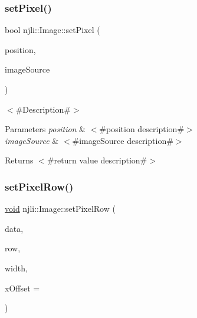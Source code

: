 \subsubsection{\texorpdfstring{set\+Pixel()}{setPixel()}\hspace{0.1cm}{\footnotesize\ttfamily [2/2]}}
{\footnotesize\ttfamily bool njli\+::\+Image\+::set\+Pixel (\begin{DoxyParamCaption}\item[{const bt\+Vector2 \&}]{position,  }\item[{const \mbox{\hyperlink{classnjli_1_1_image}{Image}} \&}]{image\+Source }\end{DoxyParamCaption})}

$<$\#\+Description\#$>$


\begin{DoxyParams}{Parameters}
{\em position} & $<$\#position description\#$>$ \\
\hline
{\em image\+Source} & $<$\#image\+Source description\#$>$\\
\hline
\end{DoxyParams}
\begin{DoxyReturn}{Returns}
$<$\#return value description\#$>$ 
\end{DoxyReturn}
\mbox{\label{classnjli_1_1_image_a795757e6b8ced8be19cfb1cab560ffd4}} 
\subsubsection{\texorpdfstring{set\+Pixel\+Row()}{setPixelRow()}}
{\footnotesize\ttfamily \mbox{\hyperlink{_thread_8h_af1e856da2e658414cb2456cb6f7ebc66}{void}} njli\+::\+Image\+::set\+Pixel\+Row (\begin{DoxyParamCaption}\item[{\mbox{\hyperlink{_util_8h_aed742c436da53c1080638ce6ef7d13de}{u8}} $\ast$}]{data,  }\item[{\mbox{\hyperlink{_util_8h_a10e94b422ef0c20dcdec20d31a1f5049}{u32}}}]{row,  }\item[{\mbox{\hyperlink{_util_8h_a10e94b422ef0c20dcdec20d31a1f5049}{u32}}}]{width,  }\item[{\mbox{\hyperlink{_util_8h_a10e94b422ef0c20dcdec20d31a1f5049}{u32}}}]{x\+Offset = {} }\end{DoxyParamCaption})\hspace{0.3cm}{\ttfamily [protected]}}

